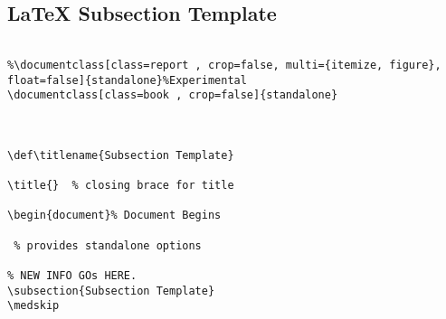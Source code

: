 \documentclass[class=book , crop=false]{standalone}
\title{}  %
\def\titlename{Subsection Template}
\begin{document}


\subsection{\LaTeX{} Subsection Template}
\medskip 
	
\begin{verbatim}

%\documentclass[class=report , crop=false, multi={itemize, figure}, float=false]{standalone}%Experimental
\documentclass[class=book , crop=false]{standalone}



\def\titlename{Subsection Template}

\title{}  % closing brace for title

\begin{document}% Document Begins

 % provides standalone options

% NEW INFO GOs HERE.
\subsection{Subsection Template}
\medskip 

\end{verbatim}
\end{document}
